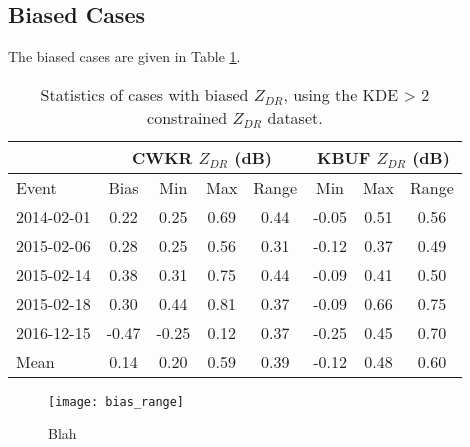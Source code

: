 \subsection{Biased Cases}
The biased cases are given in Table \ref{biased}.
\begin{table}[h]
    \caption{Statistics of cases with biased $Z_{DR}$, using the KDE > 2 constrained $Z_{DR}$ dataset.}\label{biased}
    \begin{center}
    \begin{tabular}{|l|c|c|c|c|c|c|c|}
    \hline
     &
    \multicolumn{4}{|c|}{CWKR $Z_{DR}$ (dB)} &
    \multicolumn{3}{|c|}{KBUF $Z_{DR}$ (dB)} \\
    \hline
     Event & Bias & Min & Max & Range & Min & Max & Range\\
    \hline\hline
    2014-02-01 & 0.22 & 0.25 & 0.69 & 0.44 & -0.05 & 0.51 & 0.56 \\
    \hline
    2015-02-06 & 0.28 & 0.25 & 0.56 & 0.31 & -0.12 & 0.37 & 0.49\\
    \hline
    2015-02-14 & 0.38 & 0.31  & 0.75  & 0.44 & -0.09 & 0.41 & 0.50 \\
    \hline
    2015-02-18 & 0.30 & 0.44  & 0.81  & 0.37 & -0.09 & 0.66 & 0.75 \\ 
    \hline
    2016-12-15 & -0.47 & -0.25  & 0.12  & 0.37 & -0.25 & 0.45 & 0.70  \\ 
    \hline\hline
    Mean & 0.14 & 0.20 & 0.59 & 0.39 & -0.12 & 0.48 & 0.60 \\
    \hline
    \end{tabular}
    \end{center}
\end{table}
\begin{figure}[H]
\texttt{[image: bias\_range]}
\caption{Blah} 
\label{fig:bias_compare}
\end{figure}